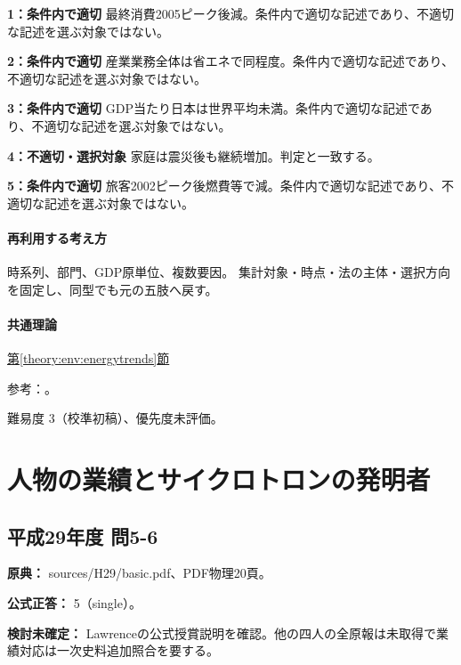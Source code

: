 \noindent\textbf{1：条件内で適切} 最終消費2005ピーク後減。条件内で適切な記述であり、不適切な記述を選ぶ対象ではない。\par

\noindent\textbf{2：条件内で適切} 産業業務全体は省エネで同程度。条件内で適切な記述であり、不適切な記述を選ぶ対象ではない。\par

\noindent\textbf{3：条件内で適切} GDP当たり日本は世界平均未満。条件内で適切な記述であり、不適切な記述を選ぶ対象ではない。\par

\noindent\textbf{4：不適切・選択対象} 家庭は震災後も継続増加。判定と一致する。\par

\noindent\textbf{5：条件内で適切} 旅客2002ピーク後燃費等で減。条件内で適切な記述であり、不適切な記述を選ぶ対象ではない。\par

\paragraph{再利用する考え方} 時系列、部門、GDP原単位、複数要因。 集計対象・時点・法の主体・選択方向を固定し、同型でも元の五肢へ戻す。

\paragraph{共通理論} \hyperref[theory:env:energytrends]{第\ref*{theory:env:energytrends}節}

\par 参考：\cite{env59_energy2019}。

\par 難易度 3（校準初稿）、優先度未評価。

\section{人物の業績とサイクロトロンの発明者}

\subsection{平成29年度 問5-6}
\label{q:h29-reg-basic-5-6}

\noindent\textbf{原典：} sources/H29/basic.pdf、PDF物理20頁。

\textbf{公式正答：} 5（single）。

\par\textbf{検討未確定：} Lawrenceの公式授賞説明を確認。他の四人の全原報は未取得で業績対応は一次史料追加照合を要する。

